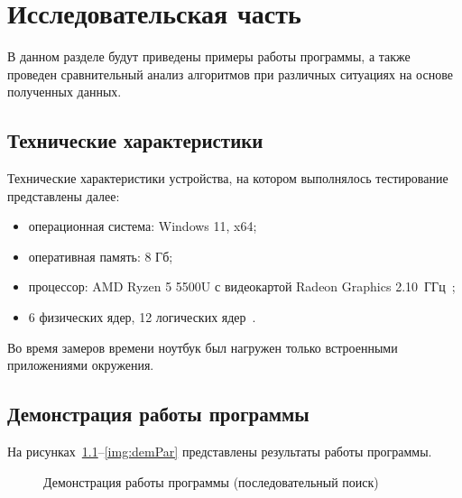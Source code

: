 \chapter{Исследовательская часть}

В данном разделе будут приведены примеры работы программы, а также проведен сравнительный анализ алгоритмов при различных ситуациях на основе полученных данных.

\section{Технические характеристики}

Технические характеристики устройства, на котором выполнялось тестирование представлены далее:
\begin{itemize}[label={---}]
	\item операционная система: Windows 11, x64;
	\item оперативная память: 8 Гб;
	\item процессор: AMD Ryzen 5 5500U с видеокартой Radeon Graphics 2.10~ГГц~\cite{amd};
	\item 6 физических ядер, 12 логических ядер~\cite{amd}.
\end{itemize}

Во время замеров времени ноутбук был нагружен только встроенными приложениями окружения.

\section{Демонстрация работы программы}

На рисунках~\ref{img:demPosl}--\ref{img:demPar} представлены результаты работы программы.

\begin{figure}[H]
	\caption{Демонстрация работы программы (последовательный поиск)}
	\label{img:demPosl}
\end{figure}

